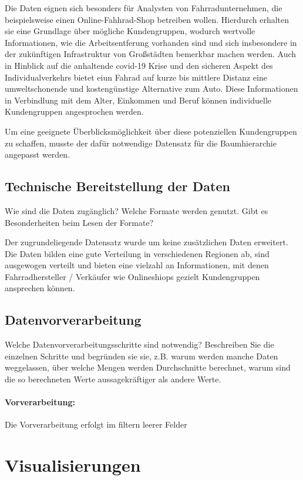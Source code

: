 \documentclass[usegeometry=true]{scrartcl}
\begin{document}
Die Daten eignen sich besonders für Analysten von Fahrradunternehmen, die beispielsweise einen Online-Fahhrad-Shop betreiben wollen. Hierdurch erhalten sie eine Grundlage über mögliche Kundengruppen, wodurch wertvolle Informationen, wie die Arbeitsentferung vorhanden sind und sich insbesondere in der zukünftigen Infrastruktur von Großstädten bemerkbar machen werden. Auch in Hinblick auf die anhaltende covid-19 Krise und den sicheren Aspekt des Individualverkehrs bietet eiun Fahrad auf kurze bis mittlere Distanz eine umweltschonende und kostengünstige Alternative zum Auto. 
Diese Informationen in Verbindlung mit dem Alter, Einkommen und Beruf können individuelle Kundengruppen angesprochen werden. 

Um eine geeignete Überblicksmöglichkeit über diese potenziellen Kundengruppen zu schaffen, musste der dafür notwendige Datensatz für die Baumhierarchie angepasst werden. 

\subsection{Technische Bereitstellung der Daten}
Wie sind die Daten zugänglich? Welche Formate werden genutzt. Gibt es Besonderheiten beim Lesen der Formate?



Der zugrundeliegende Datensatz wurde um keine zusätzlichen Daten erweitert. Die Daten bilden eine gute Verteilung in verschiedenen Regionen ab, sind ausgewogen verteilt und bieten eine vielzahl an Informationen, mit denen Fahrradhersteller / Verkäufer wie Onlineshiops gezielt Kundengruppen ansprechen können. 
\subsection{Datenvorverarbeitung}
Welche Datenvorverarbeitungsschritte sind notwendig? Beschreiben Sie die einzelnen Schritte und begründen sie sie, z.B. warum werden manche Daten weggelassen, über welche Mengen werden Durchschnitte berechnet, warum sind die so berechneten Werte aussagekräftiger als andere Werte. 

\paragraph{Vorverarbeitung:} Die Vorverarbeitung erfolgt im filtern leerer Felder

\section{Visualisierungen}
\end{document}
